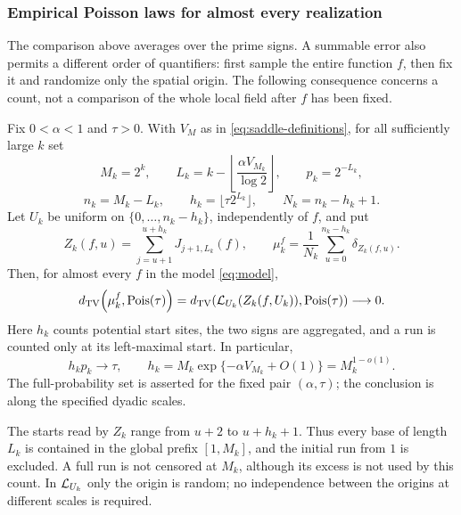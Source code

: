 \subsubsection*{Empirical Poisson laws for almost every realization}
\label{sec:empirical-poisson}
The comparison above averages over the prime signs. A summable error
also permits a different order of quantifiers: first sample the entire
function $f$, then fix it and randomize only the spatial origin. The
following consequence concerns a count, not a comparison of the whole
local field after $f$ has been fixed.

\begin{empiricalcorollary}
\label{cor:empirical-poisson}
Fix $0<\alpha<1$ and $\tau>0$. With $V_M$ as in
\eqref{eq:saddle-definitions}, for all sufficiently large $k$ set
\[
 M_k=2^k,\qquad
 L_k=k-\left\lfloor\frac{\alpha V_{M_k}}{\log2}\right\rfloor,
 \qquad p_k=2^{-L_k},
\]
\[
 n_k=M_k-L_k,\qquad h_k=\lfloor\tau 2^{L_k}\rfloor,
 \qquad N_k=n_k-h_k+1.
\]
Let $U_k$ be uniform on $\{0,\ldots,n_k-h_k\}$, independently of $f$, and put
\[
 Z_k(f,u)=\sum_{j=u+1}^{u+h_k}J_{j+1,L_k}(f),\qquad
 \mu_k^f=\frac1{N_k}\sum_{u=0}^{n_k-h_k}\delta_{Z_k(f,u)}.
\]
Then, for almost every $f$ in the model \eqref{eq:model},
\[
 d_{\mathrm{TV}}\!\left(\mu_k^f,\operatorname{Pois}(\tau)\right)
 =d_{\mathrm{TV}}\!\left(\mathcal L_{U_k}(Z_k(f,U_k)),\operatorname{Pois}(\tau)\right)
 \longrightarrow0.
\]
Here $h_k$ counts potential start sites, the two signs are aggregated,
and a run is counted only at its left-maximal start. In particular,
\[
 h_kp_k\longrightarrow\tau,\qquad
 h_k=M_k\exp\{-\alpha V_{M_k}+O(1)\}=M_k^{1-o(1)}.
\]
The full-probability set is asserted for the fixed pair $(\alpha,\tau)$;
the conclusion is along the specified dyadic scales.
\end{empiricalcorollary}

The starts read by $Z_k$ range from $u+2$ to $u+h_k+1$. Thus every
base of length $L_k$ is contained in the global prefix $[1,M_k]$, and
the initial run from $1$ is excluded. A full run is not censored at
$M_k$, although its excess is not used by this count. In
$\mathcal L_{U_k}$ only the origin is random; no independence between the
origins at different scales is required.

